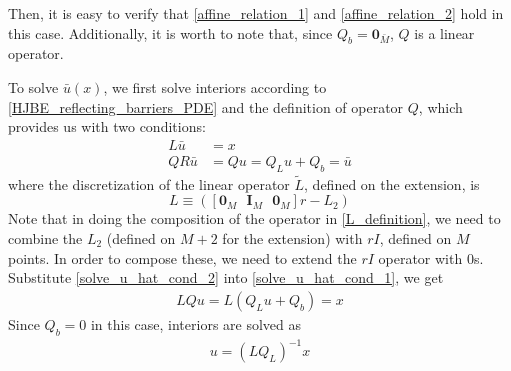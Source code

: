 \documentclass[11pt]{article}
\begin{document}
Then, it is easy to verify that \cref{affine_relation_1} and \cref{affine_relation_2} hold in this case. Additionally, it is worth to note that, since $Q_b = \mathbf{0}_{\bar{M}}$, $Q$ is a linear operator.

To solve $\bar{u}(x)$, we first solve interiors according to \cref{HJBE_reflecting_barriers_PDE} and the definition of operator $Q$, which provides us with two conditions:
\begin{align}
L \bar{u} &= x\label{solve_u_hat_cond_1}\\
Q R\bar{u} &= Q u = Q_L u+Q_b = \bar{u}\label{solve_u_hat_cond_2}
\end{align}
where the discretization of the linear operator $\tilde{L}$, defined on the extension, is
\begin{equation}
L \equiv ([\mathbf{0}_{M} \text{ } \mathbf{I}_{M} \text{ } \mathbf{0}_{M}] r - L_2)
\label{L_definition}
\end{equation}
Note that in doing the composition of the operator in \cref{L_definition}, we need to combine the $L_2$ (defined on $M+2$ for the extension) with $r I$, defined on $M$ points.  In order to compose these, we need to extend the $r I$ operator with $0$s.
Substitute \cref{solve_u_hat_cond_2} into \cref{solve_u_hat_cond_1}, we get
\begin{align}
L Q u = L (Q_L u+Q_b) = x
\end{align}
Since $Q_b = 0$ in this case, interiors are solved as
\begin{align}
u = (L Q_L)^{-1}x
\end{align}
\end{document}
